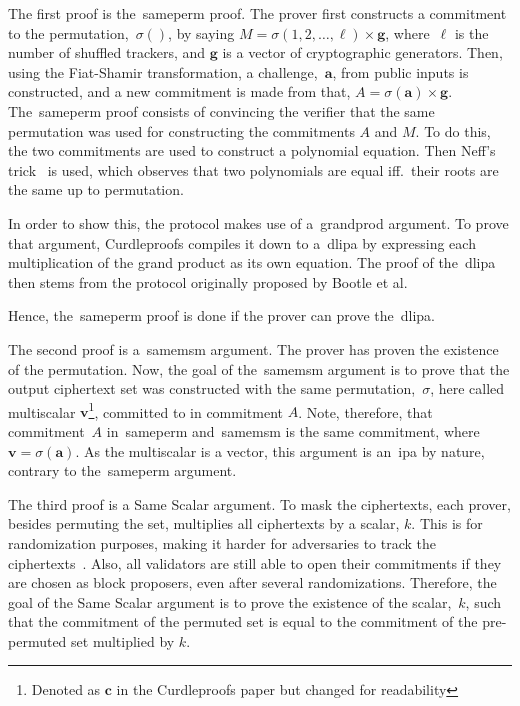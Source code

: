 The first proof is the~\gls{sameperm} proof.
The prover first constructs a commitment to the permutation,~$\sigma()$, by saying $M=\sigma(1,2,\dots,\ell)\times\mathbf{g}$, where~$\ell$ is the number of shuffled trackers, and $\mathbf{g}$ is a vector of cryptographic generators.
Then, using the Fiat-Shamir transformation, a challenge,~$\mathbf{a}$, from public inputs is constructed, and a new commitment is made from that, $A=\sigma(\mathbf{a})\times\mathbf{g}$.
The~\gls{sameperm} proof consists of convincing the verifier that the same permutation was used for constructing the commitments $A$ and $M$.
To do this, the two commitments are used to construct a polynomial equation.
Then Neff's trick~\cite{10.1145/501983.502000} is used, which observes that two polynomials are equal iff.\ their roots are the same up to permutation.

In order to show this, the protocol makes use of a~\gls{grandprod} argument.
To prove that argument, Curdleproofs compiles it down to a~\gls{dlipa} by expressing each multiplication of the grand product as its own equation.
The proof of the~\gls{dlipa} then stems from the protocol originally proposed by Bootle et al.~\cite{cryptoeprint:2016/263,Curdleproofs}

Hence, the~\gls{sameperm} proof is done if the prover can prove the~\gls{dlipa}.


The second proof is a~\gls{samemsm} argument.
The prover has proven the existence of the permutation.
Now, the goal of the~\gls{samemsm} argument is to prove that the output ciphertext set was constructed with the same permutation,~$\sigma$, here called multiscalar $\mathbf{v}$\footnote{Denoted as $\mathbf{c}$ in the Curdleproofs paper but changed for readability}, committed to in commitment $A$.
Note, therefore, that commitment~$A$ in~\gls{sameperm} and~\gls{samemsm} is the same commitment, where $\mathbf{v}=\sigma(\mathbf{a})$.
As the multiscalar is a vector, this argument is an~\gls{ipa} by nature, contrary to the~\gls{sameperm} argument.

The third proof is a Same Scalar argument.
To mask the ciphertexts, each prover, besides permuting the set, multiplies all ciphertexts by a scalar, $k$.
This is for randomization purposes, making it harder for adversaries to track the ciphertexts~\cite{Whisk2024}.
Also, all validators are still able to open their commitments if they are chosen as block proposers, even after several randomizations.
Therefore, the goal of the Same Scalar argument is to prove the existence of the scalar,~$k$, such that the commitment of the permuted set is equal to the commitment of the pre-permuted set multiplied by $k$.


